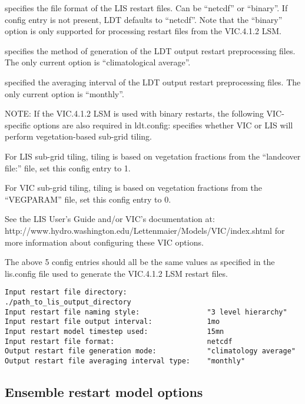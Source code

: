   specifies the file format of the
 LIS restart files.  Can be ``netcdf'' or ``binary''.  If config
 entry is not present, LDT defaults to ``netcdf''.  Note that the
 ``binary'' option is only supported for processing restart files
 from the VIC.4.1.2 LSM.

  specifies the method
 of generation of the LDT output restart preprocessing files.
 The only current option is ``climatological average''.

  specified the
 averaging interval of the LDT output restart preprocessing files.
 The only current option is ``monthly''.

 NOTE: If the VIC.4.1.2 LSM is used with binary restarts, the
 following VIC-specific options are also required in ldt.config:
  specifies whether VIC or LIS
 will perform vegetation-based sub-grid tiling.

 For LIS sub-grid tiling, tiling is based on vegetation fractions
 from the ``landcover file:'' file, set this config entry to 1.

 For VIC sub-grid tiling, tiling is based on vegetation fractions
 from the ``VEGPARAM'' file, set this config entry to 0.

 See the LIS User's Guide and/or VIC's documentation at:
 http://www.hydro.washington.edu/Lettenmaier/Models/VIC/index.shtml
 for more information about configuring these VIC options.

 The above 5 config entries should all be the same values as specified in
 the lis.config file used to generate the VIC.4.1.2 LSM restart files.
 

 \begin{Verbatim}[frame=single]
Input restart file directory:                   ./path_to_lis_output_directory
Input restart file naming style:                "3 level hierarchy"
Input restart file output interval:             1mo
Input restart model timestep used:              15mn
Input restart file format:                      netcdf
Output restart file generation mode:            "climatology average"
Output restart file averaging interval type:    "monthly"
 \end{Verbatim}


 
 \subsection{Ensemble restart model options} \label{ssec:ensrstopts}
 


